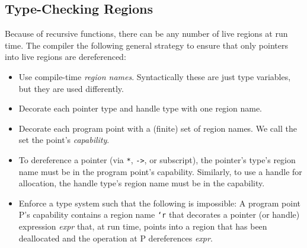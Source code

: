 


\subsection{Type-Checking Regions}

Because of recursive functions, there can be any number of live
regions at run time.  The compiler the following general strategy to
ensure that only pointers into live regions are dereferenced:

\begin{itemize}
\item Use compile-time \emph{region names}.  Syntactically these are
  just type variables, but they are used differently.
\item Decorate each pointer type and handle type with one region name. 
\item Decorate each program point with a (finite) set of region names.
  We call the set the point's \emph{capability}.
\item To dereference a pointer (via \texttt{*}, \texttt{->}, or
  subscript), the pointer's type's region name must be in the program
  point's capability.  Similarly, to use a handle for allocation, the
  handle type's region name must be in the capability.
\item Enforce a type system such that the following is impossible: A
  program point P's capability contains a region name \texttt{`r} that
  decorates a pointer (or handle) expression \textit{expr} that, at
  run time, points into a region that has been deallocated and the
  operation at P dereferences \textit{expr}.
\end{itemize}


